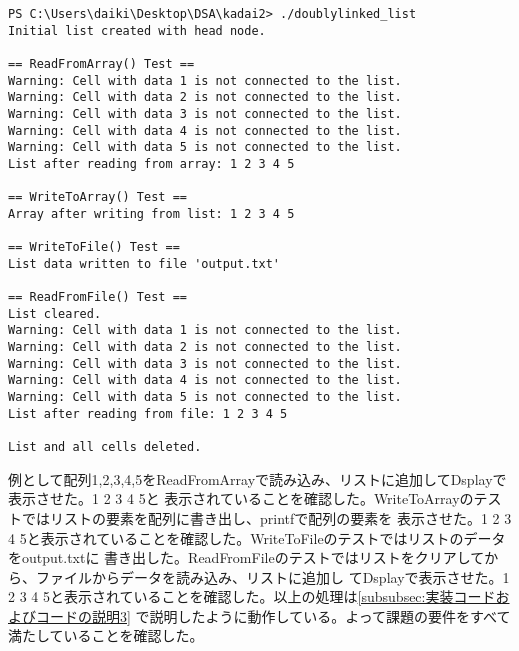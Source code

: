 \documentclass{ltjsarticle}
\begin{document}
\begin{lstlisting}
PS C:\Users\daiki\Desktop\DSA\kadai2> ./doublylinked_list   
Initial list created with head node.

== ReadFromArray() Test ==
Warning: Cell with data 1 is not connected to the list.
Warning: Cell with data 2 is not connected to the list.
Warning: Cell with data 3 is not connected to the list.
Warning: Cell with data 4 is not connected to the list.
Warning: Cell with data 5 is not connected to the list.
List after reading from array: 1 2 3 4 5

== WriteToArray() Test ==
Array after writing from list: 1 2 3 4 5

== WriteToFile() Test ==
List data written to file 'output.txt'

== ReadFromFile() Test ==
List cleared.
Warning: Cell with data 1 is not connected to the list.
Warning: Cell with data 2 is not connected to the list.
Warning: Cell with data 3 is not connected to the list.
Warning: Cell with data 4 is not connected to the list.
Warning: Cell with data 5 is not connected to the list.
List after reading from file: 1 2 3 4 5

List and all cells deleted.
\end{lstlisting}
例として配列{1,2,3,4,5}をReadFromArrayで読み込み、リストに追加してDsplayで表示させた。1 2 3 4 5と
表示されていることを確認した。WriteToArrayのテストではリストの要素を配列に書き出し、printfで配列の要素を
表示させた。1 2 3 4 5と表示されていることを確認した。WriteToFileのテストではリストのデータをoutput.txtに
書き出した。ReadFromFileのテストではリストをクリアしてから、ファイルからデータを読み込み、リストに追加し
てDsplayで表示させた。1 2 3 4 5と表示されていることを確認した。以上の処理は\ref{subsubsec:実装コードおよびコードの説明3}
で説明したように動作している。よって課題の要件をすべて満たしていることを確認した。
\end{document}
